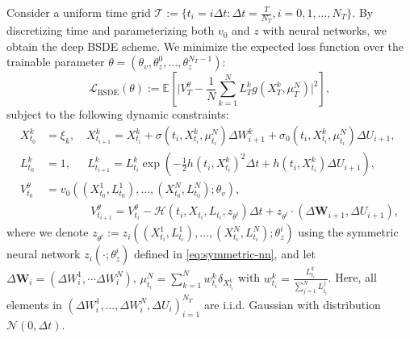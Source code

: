 \documentclass[11pt]{article}
\numberwithin{equation}{section}
\theoremstyle{plain}
\theoremstyle{definition}
\theoremstyle{remark}
\begin{document}
	Consider a uniform time grid $\mathcal{T}:=\{t_i=i\Delta t: \Delta t = \frac{T}{N_T}, i=0,1,\dots, N_T\}$. By discretizing time and parameterizing both $v_0$ and $z$ with neural networks, we obtain the deep BSDE scheme. We minimize the expected loss function over the trainable parameter $\theta = (\theta_v, \theta_z^{0},\dots,\theta_z^{N_T-1})$: 
	\begin{equation} \label{eq:loss-bsde}
		\mathcal{L}_{\text{BSDE}}(\theta) := \mathbb{E}\left[ \bigg| V_{T}^{\theta} - \frac{1}{N}\sum_{k=1}^N L_{T}^k g(X_T^k, \mu^N_T)\bigg|^2 \right], 
	\end{equation}
	subject to the following dynamic constraints: 
	\begin{equation} \label{eq:bsde-sample-trajectory}
		\begin{aligned}
			X_{t_0}^k &= \xi_k, \quad X_{t_{i+1}}^k = X_{t_i}^k + \sigma(t_i, X_{t_i}^k, \mu_{t_i}^N) \Delta W_{i+1}^k + \sigma_0(t_i, X_{t_i}^k, \mu_{t_i}^N)\Delta U_{i+1}, \\
			L_{t_0}^k &= 1, ~~\quad L_{t_{i+1}}^k = L_{t_i}^k \exp\left(-\frac{1}{2}h(t_i, X_{t_i}^k)^2 \Delta t + h(t_i, X_{t_i}^k)\Delta U_{i+1}\right), \\
			V_{t_0}^\theta &= v_0((X_{t_0}^1, L_{t_0}^1), \dots, (X_{t_0}^N, L_{t_0}^N); \theta_v), \\ 
			&\qquad \qquad  V_{t_{i+1}}^{\theta} = V_{t_i}^\theta - \mathcal{H}\left(t_i, X_{t_i}, L_{t_i}, z_{\theta^i}\right)\Delta t + z_{\theta^i} \cdot (\Delta \mathbf{W}_{i+1}, \Delta U_{i+1}), 
		\end{aligned}
	\end{equation}
	where we denote $z_{\theta^i}:= z_i\left((X_{t_i}^1, L_{t_i}^1), \dots, (X_{t_i}^N, L_{t_i}^N); \theta_z^i\right)$ using the symmetric neural network $z_i(\cdot;\theta_z^i)$ defined in \eqref{eq:symmetric-nn}, and let $\Delta \mathbf{W}_i = (\Delta W_i^1, \dotsm \Delta W_i^N)$, $\mu_{t_i}^N = \sum_{k=1}^N w_{t_i}^k \delta_{X_{t_i}^k}$ with $w_{t_i}^k = \frac{L_{t_i}^k}{\sum_{j=1}^N L_{t_i}^j}$. Here, all elements in $(\Delta W_{i}^1, \dots, \Delta W_i^N, \Delta U_i)_{i=1}^{N_T}$ are i.i.d. Gaussian with distribution $\mathcal{N}(0,\Delta t)$. 
	
\end{document}
